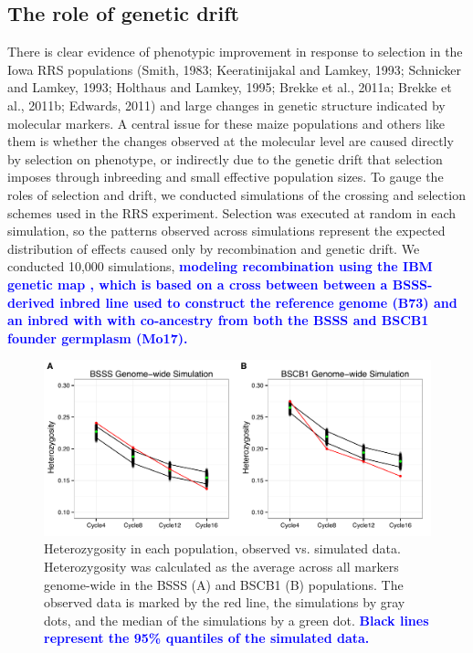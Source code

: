 \documentclass[twocolumn,twoside,letterpaper]{article}
\newcommand{\rev}[1]{\textcolor{blue}{\bf #1}}
\begin{document}
\subsection*{The role of genetic drift}
There is clear evidence of phenotypic improvement in response to selection in the Iowa RRS populations (Smith, 1983; Keeratinijakal and Lamkey, 1993; Schnicker and Lamkey, 1993; Holthaus and Lamkey, 1995; Brekke et al., 2011a; Brekke et al., 2011b; Edwards, 2011) and large changes in genetic structure indicated by molecular markers. 
A central issue for these maize populations and others like them is whether the changes observed at the molecular level are caused directly by selection on phenotype, or indirectly due to the genetic drift that selection imposes through inbreeding and small effective population sizes. 
To gauge the roles of selection and drift, we conducted simulations of the crossing and selection schemes used in the RRS experiment.
Selection was executed at random in each simulation, so the patterns observed across simulations represent the expected distribution of effects caused only by recombination and genetic drift. 
We conducted 10,000 simulations, \rev{modeling recombination using the IBM genetic map \citep{lee2002expanding}, which is based on a cross between between a BSSS-derived inbred line used to construct the reference genome (B73) and an inbred with  with co-ancestry from both the BSSS and BSCB1 founder germplasm (Mo17).} 	

\begin{figure}[tb]   
   \includegraphics[width=0.7\linewidth]{Fig_S1_combined.pdf}
   \caption{Heterozygosity in each population, observed vs. simulated data. Heterozygosity was calculated as the average across all markers genome-wide  in the BSSS (A)  and BSCB1 (B) populations. The observed data is marked by the red line, the simulations by gray dots, and the median of the simulations by a green dot. \rev{Black lines represent the 95\% quantiles of the simulated data.} } 
    \label{fig:compare_to_sims}
\end{figure}
\end{document}
